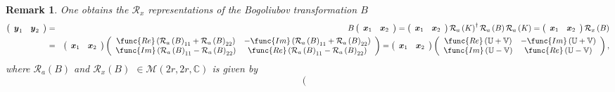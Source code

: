 \documentclass[aps,preprint]{revtex4}
\newtheorem{remark}[theorem]{Remark}
\begin{document}
\begin{remark}
One obtains the $\mathcal{R}_{x}$ representations of the Bogoliubov
transformation $B$%
\begin{eqnarray}
\left( 
\begin{array}{cc}
\boldsymbol{y}_{1} & \boldsymbol{y}_{2}%
\end{array}%
\right) &=&B\left( 
\begin{array}{cc}
\boldsymbol{x}_{1} & \boldsymbol{x}_{2}%
\end{array}%
\right) =\left( 
\begin{array}{cc}
\boldsymbol{x}_{1} & \boldsymbol{x}_{2}%
\end{array}%
\right) \mathcal{R}_{a}\left( K\right) ^{\dagger }\mathcal{R}_{a}\left(
B\right) \mathcal{R}_{a}\left( K\right) =\left( 
\begin{array}{cc}
\boldsymbol{x}_{1} & \boldsymbol{x}_{2}%
\end{array}%
\right) \mathcal{R}_{x}\left( B\right) \\
&=&\left( 
\begin{array}{cc}
\boldsymbol{x}_{1} & \boldsymbol{x}_{2}%
\end{array}%
\right) \left( 
\begin{array}{cc}
\func{Re}\left( \mathcal{R}_{a}\left( B\right) _{11}+\mathcal{R}_{a}\left(
B\right) _{22}\right) & -\func{Im}\left( \mathcal{R}_{a}\left( B\right)
_{11}+\mathcal{R}_{a}\left( B\right) _{22}\right) \\ 
\func{Im}\left( \mathcal{R}_{a}\left( B\right) _{11}-\mathcal{R}_{a}\left(
B\right) _{22}\right) & \func{Re}\left( \mathcal{R}_{a}\left( B\right) _{11}-%
\mathcal{R}_{a}\left( B\right) _{22}\right)%
\end{array}%
\right) =\left( 
\begin{array}{cc}
\boldsymbol{x}_{1} & \boldsymbol{x}_{2}%
\end{array}%
\right) \left( 
\begin{array}{cc}
\func{Re}\left( \mathbb{U+V}\right) & -\func{Im}\left( \mathbb{U+V}\right)
\\ 
\func{Im}\left( \mathbb{U-V}\right) & \func{Re}\left( \mathbb{U-V}\right)%
\end{array}%
\right) ,
\end{eqnarray}%
where $\mathcal{R}_{a}\left( B\right) $ and $\mathcal{R}_{x}\left( B\right) $
$\in \mathcal{M}\left( 2r,2r,\mathbb{C}\right) $ is given by 
\begin{equation}
\left( 
\begin{array}{cc}

\end{array}
\end{equation}
\end{remark}
\end{document}
